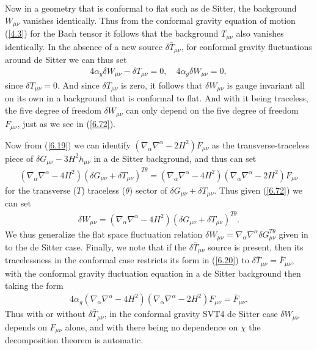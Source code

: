 \documentclass[aps,onecolumn,10pt]{revtex4}
\numberwithin{equation}{section}
\numberwithin{equation}{section}
\begin{document}
Now in a geometry that is conformal to flat such as de Sitter, the background $W_{\mu\nu}$ vanishes identically. Thus from the conformal gravity equation of motion (\ref{4.3}) for the Bach tensor it follows that the background $T_{\mu\nu}$ also vanishes identically. In the absence of a new source $\delta \bar{T}_{\mu\nu}$, for conformal gravity fluctuations around de Sitter  we can thus set 
%
\begin{eqnarray}
4\alpha_g\delta W_{\mu\nu}-\delta T_{\mu\nu}=0,\quad 4\alpha_g\delta W_{\mu\nu}=0,
\label{6.73}
\end{eqnarray}
%
since $\delta T_{\mu\nu}=0$. And since $\delta T_{\mu\nu}$ is zero,  it follows that  $\delta W_{\mu\nu}$ is gauge invariant all on its own in a background that is conformal to flat. And with it being traceless, the five degree of freedom $\delta W_{\mu\nu}$ can only depend on the five degree of freedom $F_{\mu\nu}$, just as we see in (\ref{6.72}). 

Now from  (\ref{6.19}) we can identify $(\nabla_{\alpha}\nabla^{\alpha}-2H^2)F_{\mu\nu}$ as the transverse-traceless piece of $\delta G_{\mu\nu}-3H^2h_{\mu\nu}$ in a de Sitter background, and thus can set 
%
\begin{eqnarray}
(\nabla_{\alpha}\nabla^{\alpha}-4H^2)(\delta G_{\mu\nu}+\delta T_{\mu\nu})^{T\theta}=(\nabla_{\alpha}\nabla^{\alpha}-4H^2)(\nabla_{\alpha}\nabla^{\alpha}-2H^2)F_{\mu\nu}
\label{6.74}
\end{eqnarray}
%
for the transverse ($T$) traceless ($\theta$) sector of $\delta G_{\mu\nu}+\delta T_{\mu\nu}$. Thus given (\ref{6.72}) we can set
%
\begin{eqnarray}
\delta W_{\mu\nu}=(\nabla_{\alpha}\nabla^{\alpha}-4H^2)(\delta G_{\mu\nu}+\delta T_{\mu\nu})^{T\theta}.
\label{6.75}
\end{eqnarray}
%
We thus generalize the flat space fluctuation relation $\delta W_{\mu\nu}=\nabla_{\alpha}\nabla^{\alpha}\delta G_{\mu\nu}^{T\theta}$ given in \cite{footnote6} to the de Sitter case. Finally, we note that if the  $\delta\bar{T}_{\mu\nu}$ source is present, then its tracelessness in the conformal case restricts its form in (\ref{6.20}) to $\delta \bar{T}_{\mu\nu}=\bar{F}_{\mu\nu}$, with the conformal gravity fluctuation equation in a de Sitter background then taking the form 
%
\begin{eqnarray}
4\alpha_g(\nabla_{\alpha}\nabla^{\alpha}-4H^2)(\nabla_{\alpha}\nabla^{\alpha}-2H^2)F_{\mu\nu}=\bar{F}_{\mu\nu}.
\label{6.76}
\end{eqnarray}
%
Thus with or without $\delta \bar{T}_{\mu\nu}$, in the conformal gravity SVT4 de Sitter case $\delta W_{\mu\nu}$ depends on $F_{\mu\nu}$ alone, and with there being no dependence on $\chi$ the decomposition theorem is automatic. 
\end{document}
